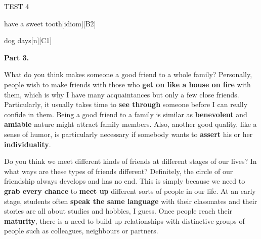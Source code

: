 \begin{glossarymc}[Cambridge 8]
\begin{test}{TEST 4}
\begin{VocabExplain}[Part 2]
            \begin{ExplainCard}{have a sweet tooth}[idiom][B2]
            \end{ExplainCard}

            \begin{ExplainCard}{dog days}[n][C1]
            \end{ExplainCard}
        \end{VocabExplain}

    \noindent
    \textbf{Part 3.}
    \begin{qa}{What do you think makes someone a good friend to a whole family?}
    Personally, people wish to make friends with those who \textbf{get on like a house on fire} with them, which is why I have many acquaintances but only a few close friends. Particularly, it usually takes time to \textbf{see through} someone before I can really confide in them. Being a good friend to a family is similar as \textbf{benevolent} and \textbf{amiable} nature might attract family members. Also, another good quality, like a sense of humor, is particularly necessary if somebody wants to \textbf{assert} his or her \textbf{individuality}.
    \end{qa}

    \begin{qa}{Do you think we meet different kinds of friends at different stages of our lives? In what ways are these types of friends different?}
    Definitely, the circle of our friendship always develops and has no end. This is simply because we need to \textbf{grab every chance} to \textbf{meet up} different sorts of people in our life. At an early stage, students often \textbf{speak the same language} with their classmates and their stories are all about studies and hobbies, I guess. Once people reach their \textbf{maturity}, there is a need to build up relationships with distinctive groups of people such as colleagues, neighbours or partners.
    \end{qa}


\end{test}
\end{glossarymc}
